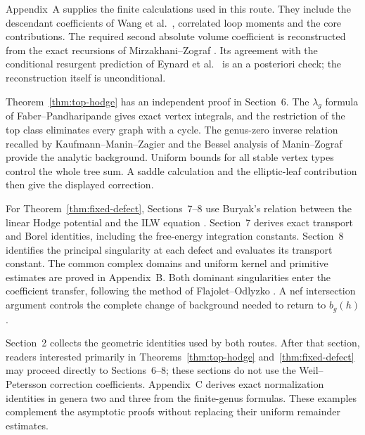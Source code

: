 Appendix~A supplies the finite calculations used in this route.
They include the descendant coefficients of Wang et al.\
\cite[Lemma 7.2 and Appendix C.1]{W26}, correlated loop moments
and the core contributions. The required second absolute volume
coefficient is reconstructed from the exact recursions of
Mirzakhani--Zograf \cite[\S 2]{MZ15}. Its agreement with the
conditional resurgent prediction of Eynard et al.\
\cite[\S 6.1, (6.10)]{EGGLS24} is an a posteriori check;
the reconstruction itself is unconditional.

Theorem~\ref{thm:top-hodge} has an independent proof in Section~6.
The $\lambda_g$ formula of Faber--Pandharipande
\cite[Theorem 1]{FP03} gives exact vertex integrals, and the
restriction of the top class eliminates every graph with a cycle.
The genus-zero inverse relation recalled by Kaufmann--Manin--Zagier
\cite[(0.8)]{KMZ96v1} and the Bessel analysis of Manin--Zograf
\cite[\S 6, (17) and Proof 6.3]{MaZ00} provide the analytic
background. Uniform bounds for all stable vertex types control
the whole tree sum. A saddle calculation and the elliptic-leaf
contribution then give the displayed correction.

For Theorem~\ref{thm:fixed-defect}, Sections~7--8 use Buryak's relation
between the linear Hodge potential and the ILW equation
\cite[Theorem 1.1]{Bur15}. Section~7 derives exact transport and
Borel identities, including the free-energy integration constants.
Section~8 identifies the principal singularity at each defect and
evaluates its transport constant. The common complex domains and
uniform kernel and primitive estimates are proved in Appendix~B.
Both dominant singularities enter the coefficient transfer,
following the method of Flajolet--Odlyzko \cite[\S 2]{FO90}.
A nef intersection argument controls the complete change of
background needed to return to $b_g(h)$.

Section~2 collects the geometric identities used by both routes.
After that section, readers interested primarily in
Theorems~\ref{thm:top-hodge} and~\ref{thm:fixed-defect}
may proceed directly to Sections~6--8; these sections do not use
the Weil--Petersson correction coefficients. Appendix~C derives
exact normalization identities in genera two and three from the
finite-genus formulas. These examples complement the asymptotic
proofs without replacing their uniform remainder estimates.
